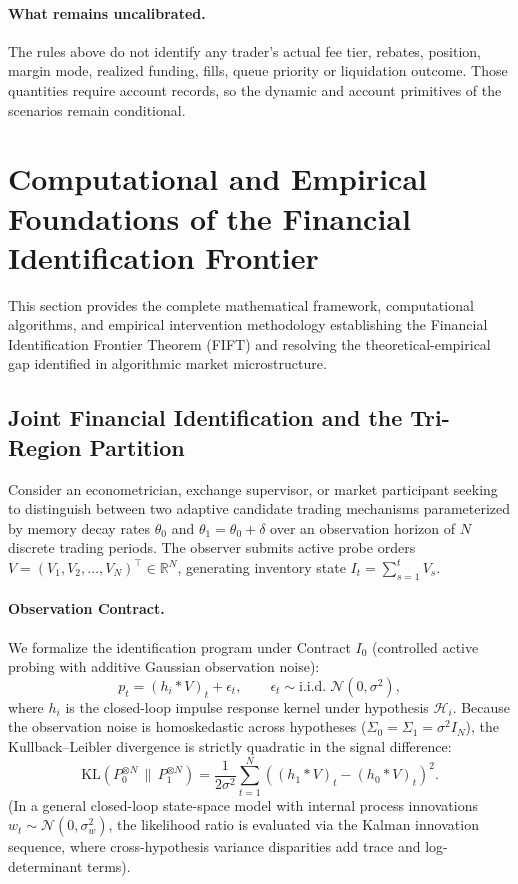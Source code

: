\documentclass[12pt]{article}
\theoremstyle{definition}
\theoremstyle{remark}
\newcommand{\R}{\mathbb{R}}
\begin{document}
\paragraph{What remains uncalibrated.} The rules above do not identify any trader's actual fee tier, rebates, position, margin mode, realized funding, fills, queue priority or liquidation outcome. Those quantities require account records, so the dynamic and account primitives of the scenarios remain conditional.

\section{Computational and Empirical Foundations of the Financial Identification Frontier}
\label{ia:breakthrough_foundations}

This section provides the complete mathematical framework, computational algorithms, and empirical intervention methodology establishing the Financial Identification Frontier Theorem (FIFT) and resolving the theoretical-empirical gap identified in algorithmic market microstructure.

\subsection{Joint Financial Identification and the Tri-Region Partition}
\label{ia:frontier_program}

Consider an econometrician, exchange supervisor, or market participant seeking to distinguish between two adaptive candidate trading mechanisms parameterized by memory decay rates $\theta_0$ and $\theta_1 = \theta_0 + \delta$ over an observation horizon of $N$ discrete trading periods. The observer submits active probe orders $V = (V_1, V_2, \dots, V_N)^\top \in \R^N$, generating inventory state $I_t = \sum_{s=1}^t V_s$. 

\paragraph{Observation Contract.} We formalize the identification program under Contract $I_0$ (controlled active probing with additive Gaussian observation noise):
\begin{equation}
p_t = (h_i * V)_t + \epsilon_t, \qquad \epsilon_t \sim \text{i.i.d.} \; \mathcal{N}(0, \sigma^2),
\end{equation}
where $h_i$ is the closed-loop impulse response kernel under hypothesis $\mathcal{H}_i$. Because the observation noise is homoskedastic across hypotheses ($\Sigma_0 = \Sigma_1 = \sigma^2 I_N$), the Kullback--Leibler divergence is strictly quadratic in the signal difference:
\begin{equation}
\mathrm{KL}(P_0^{\otimes N} \,\|\, P_1^{\otimes N}) = \frac{1}{2\sigma^2} \sum_{t=1}^N \left( (h_1 * V)_t - (h_0 * V)_t \right)^2.
\end{equation}
(In a general closed-loop state-space model with internal process innovations $w_t \sim \mathcal{N}(0, \sigma_w^2)$, the likelihood ratio is evaluated via the Kalman innovation sequence, where cross-hypothesis variance disparities add trace and log-determinant terms).
\end{document}
